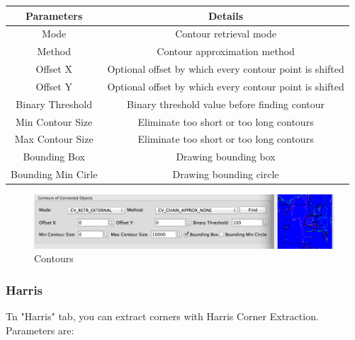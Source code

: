 \documentclass{article}
\begin{document}
\begin{table}[H]
\begin{center}
\begin{tabular}{|c|c|l|l|l|}
\hline
\textbf{Parameters} & \multicolumn{4}{|c|}{\textbf{Details}}                                        \\ \hline
Mode                & \multicolumn{4}{|c|}{Contour retrieval mode}                                  \\ \hline
Method              & \multicolumn{4}{|c|}{Contour approximation method}                            \\ \hline
Offset X            & \multicolumn{4}{|c|}{Optional offset by which every contour point is shifted} \\ \hline
Offset Y            & \multicolumn{4}{|c|}{Optional offset by which every contour point is shifted} \\ \hline
Binary Threshold    & \multicolumn{4}{|c|}{Binary threshold value before finding contour}           \\ \hline
Min Contour Size    & \multicolumn{4}{|c|}{Eliminate too short or too long contours}                \\ \hline
Max Contour Size    & \multicolumn{4}{|c|}{Eliminate too short or too long contours}                \\ \hline
Bounding Box        & \multicolumn{4}{|c|}{Drawing bounding box}                                    \\ \hline
Bounding Min Cirle  & \multicolumn{4}{|c|}{Drawing bounding circle}                                 \\ \hline
\end{tabular}
\end{center}
\end{table}


\begin{figure}[H]
\begin{center}
\includegraphics[scale=0.5]{toolboxContours.png}
\caption{Contours}
\end{center}
\end{figure}	

\subsubsection{Harris}
Tn "Harris" tab, you can extract corners with Harris Corner Extraction. Parameters are:
\end{document}

